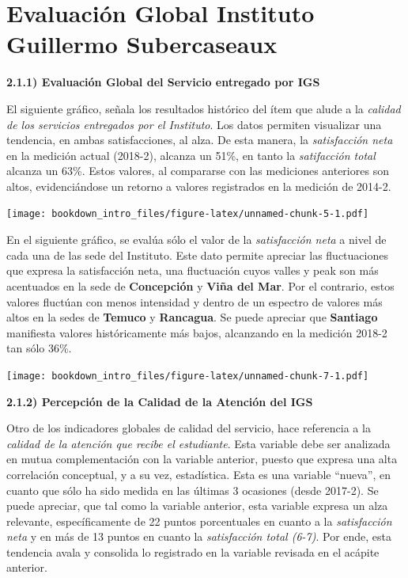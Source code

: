\documentclass[]{book}
\begin{document}
\section{Evaluación Global Instituto Guillermo
Subercaseaux}\label{evaluacion-global-instituto-guillermo-subercaseaux}

\textbf{2.1.1) Evaluación Global del Servicio entregado por IGS}

El siguiente gráfico, señala los resultados histórico del ítem que alude
a la \emph{calidad de los servicios entregados por el Instituto}. Los
datos permiten visualizar una tendencia, en ambas satisfacciones, al
alza. De esta manera, la \emph{satisfacción neta} en la medición actual
(2018-2), alcanza un 51\%, en tanto la \emph{satifacción total} alcanza
un 63\%. Estos valores, al compararse con las mediciones anteriores son
altos, evidenciándose un retorno a valores registrados en la medición de
2014-2.

\texttt{[image: bookdown\_intro\_files/figure-latex/unnamed-chunk-5-1.pdf]}

En el siguiente gráfico, se evalúa sólo el valor de la
\emph{satisfacción neta} a nivel de cada una de las sede del Instituto.
Este dato permite apreciar las fluctuaciones que expresa la satisfacción
neta, una fluctuación cuyos valles y peak son más acentuados en la sede
de \textbf{Concepción} y \textbf{Viña del Mar}. Por el contrario, estos
valores fluctúan con menos intensidad y dentro de un espectro de valores
más altos en la sedes de \textbf{Temuco} y \textbf{Rancagua}. Se puede
apreciar que \textbf{Santiago} manifiesta valores históricamente más
bajos, alcanzando en la medición 2018-2 tan sólo 36\%.

\texttt{[image: bookdown\_intro\_files/figure-latex/unnamed-chunk-7-1.pdf]}

\textbf{2.1.2) Percepción de la Calidad de la Atención del IGS}

Otro de los indicadores globales de calidad del servicio, hace
referencia a la \emph{calidad de la atención que recibe el estudiante}.
Esta variable debe ser analizada en mutua complementación con la
variable anterior, puesto que expresa una alta correlación conceptual, y
a su vez, estadística. Esta es una variable ``nueva'', en cuanto que
sólo ha sido medida en las últimas 3 ocasiones (desde 2017-2). Se puede
apreciar, que tal como la variable anterior, esta variable expresa un
alza relevante, específicamente de 22 puntos porcentuales en cuanto a la
\emph{satisfacción neta} y en más de 13 puntos en cuanto la
\emph{satisfacción total (6-7)}. Por ende, esta tendencia avala y
consolida lo registrado en la variable revisada en el acápite anterior.
\end{document}
